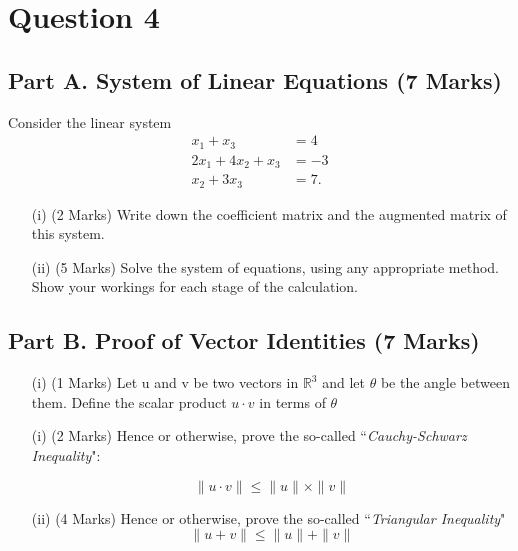\documentclass[a4paper,12pt]{article}
\begin{document}
\newpage
 \section*{Question 4}
	\subsection*{Part A. System of Linear Equations (7 Marks)}
 Consider the linear system
		\begin{align*}
		x_1 + x_3 &= 4\\
		2x_1 + 4x_2 + x_3 &= -3\\
		x_2 + 3x_3 &= 7.
		\end{align*}
		\begin{itemize}
			\item[(i)] (2 Marks) Write down the coefficient matrix and the augmented matrix of this system.  %
			
			
			\item[(ii)] (5 Marks) Solve the system of equations, using any appropriate method. Show your workings for each stage of the calculation.
		\end{itemize}



	\subsection*{Part B. Proof of Vector Identities (7 Marks)}
	\begin{itemize}
		\item[(i)] (1 Marks) Let u and v be two vectors in $\mathbb{R}^3$ and let $\theta$ be the angle between them. Define the scalar product $u \cdot v$ in terms of $\theta$ 
		\item[(i)] (2 Marks) Hence or otherwise, prove the so-called ``\textit{Cauchy-Schwarz Inequality}":
		
		\[ \|u \cdot v \|  \leq \|u \|\times \| v \|  \]
		\item[(ii)] (4 Marks) Hence or otherwise, prove the so-called ``\textit{Triangular Inequality}"
		\[ \|u + v\|  \leq  \|u \| +  \| v \| \]
		
%		
	\end{itemize}
	
\end{document}
